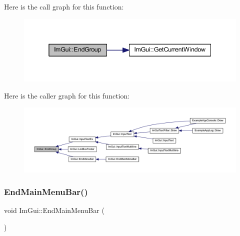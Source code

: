 Here is the call graph for this function\+:
\nopagebreak
\begin{figure}[H]
\begin{center}
\leavevmode
\includegraphics[width=338pt]{namespace_im_gui_a05fc97fc64f28a55486087f503d9a622_cgraph}
\end{center}
\end{figure}
Here is the caller graph for this function\+:
\nopagebreak
\begin{figure}[H]
\begin{center}
\leavevmode
\includegraphics[width=350pt]{namespace_im_gui_a05fc97fc64f28a55486087f503d9a622_icgraph}
\end{center}
\end{figure}
\mbox{\label{namespace_im_gui_ab92f330c808546b340eb7bdf7e5f7c95}} 
\subsubsection{\texorpdfstring{End\+Main\+Menu\+Bar()}{EndMainMenuBar()}}
{\footnotesize\ttfamily void Im\+Gui\+::\+End\+Main\+Menu\+Bar (\begin{DoxyParamCaption}{ }\end{DoxyParamCaption})}

